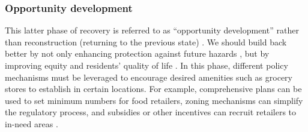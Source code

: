 \documentclass[onecolumn,doublespacing]{risa}
\let \cite \parencite
\begin{document}
\subsubsection{Opportunity development}
This latter phase of recovery is referred to as ``opportunity development'' rather than reconstruction (returning to the previous state) \cite{Resendiz-Vazquez2019-ol,Pantelic1991-qu}. 
We should build back better \cite{Resendiz-Vazquez2019-ol} by not only enhancing protection against future hazards \cite{Platt2019-lx}, but by improving equity and residents’ quality of life \cite{Pantelic1991-qu}. 
In this phase, different policy mechanisms must be leveraged to encourage desired amenities such as grocery stores to establish in certain locations. 
For example, comprehensive plans can be used to set minimum numbers for food retailers, zoning mechanisms can simplify the regulatory process, and subsidies or other incentives can recruit retailers to in-need areas \cite{Raja2010-cm, Raja2008-wx}. 
\end{document}
